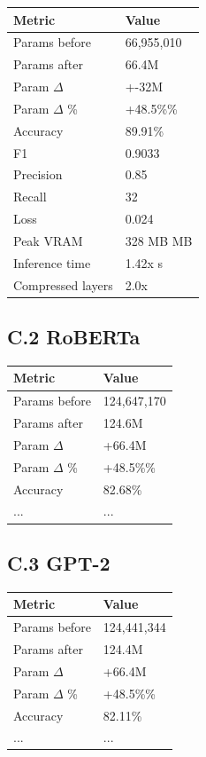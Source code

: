 \begin{table}[H]
\centering
\small
\begin{tabular}{ll}
\toprule
\textbf{Metric} & \textbf{Value} \\
\midrule
Params before & 66,955,010 \\
Params after & 66.4M \\
Param $\Delta$ & +-32M \\
Param $\Delta$ \% & +48.5\%\% \\
Accuracy & 89.91\% \\
F1 & 0.9033 \\
Precision & 0.85 \\
Recall & 32 \\
Loss & 0.024 \\
Peak VRAM & 328 MB MB \\
Inference time & 1.42x s \\
Compressed layers & 2.0x \\
\bottomrule
\end{tabular}
\end{table}

\subsection{C.2 RoBERTa}

\begin{table}[H]
\centering
\small
\begin{tabular}{ll}
\toprule
\textbf{Metric} & \textbf{Value} \\
\midrule
Params before & 124,647,170 \\
Params after & 124.6M \\
Param $\Delta$ & +66.4M \\
Param $\Delta$ \% & +48.5\%\% \\
Accuracy & 82.68\% \\
... & ... \\
\bottomrule
\end{tabular}
\end{table}

\subsection{C.3 GPT-2}

\begin{table}[H]
\centering
\small
\begin{tabular}{ll}
\toprule
\textbf{Metric} & \textbf{Value} \\
\midrule
Params before & 124,441,344 \\
Params after & 124.4M \\
Param $\Delta$ & +66.4M \\
Param $\Delta$ \% & +48.5\%\% \\
Accuracy & 82.11\% \\
... & ... \\
\bottomrule
\end{tabular}
\end{table}

